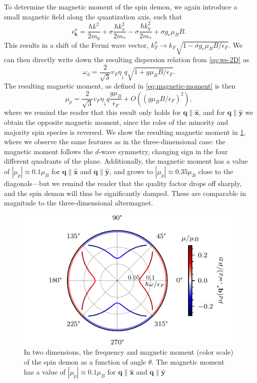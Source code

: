 \documentclass[aps,prb,reprint,twocolumns,superscriptaddress,nofootinbib]{revtex4-2}
\newcommand{\xx}{\hat{\bm{x}}}
\newcommand{\yy}{\hat{\bm{y}}}
\newcommand{\kF}{k_{F}}
\begin{document}
	To determine the magnetic moment of the spin demon, we again introduce a small magnetic field along the quantization axis, such that
	\begin{equation}
		\epsilon_{\bm k}^\sigma = \frac{\hbar k^2}{2m_0} + \sigma \frac{\hbar k_x^2}{2m_*} - \sigma \frac{\hbar k_y^2}{2m_*} + \sigma g_e\mu_B B.
	\end{equation} 
	This results in a shift of the Fermi wave vector, $\kF^\sigma\rightarrow \kF\sqrt{1-\sigma g_e\mu_B B / \epsilon_F}$. We can then directly write down the resulting dispersion relation from \cref{eq:ws-2D} as
	\begin{equation}
		\omega_{d}=\frac{2}{\sqrt{3}} v_F \eta_\downarrow q \sqrt{1+g\mu_B B / \epsilon_F}.
	\end{equation}
	The resulting magnetic moment, as defined in \cref{eq:magnetic-moment} is then
	\begin{equation}
		\mu_p = \frac{2}{\sqrt{3}} v_F \eta_\downarrow q \frac{g\mu_B}{\epsilon_F} + O((g\mu_B B / \epsilon_F)^2),
	\end{equation}
	where we remind the reader that this result only holds for $\bm q\parallel \xx$, and for $\bm q\parallel \yy$ we obtain the opposite magnetic moment, since the roles of the minority and majority spin species is reversed. We show the resulting magnetic moment in \cref{fig:2D-magnetic-moment}, where we observe the same features as in the three-dimensional case: the magnetic moment follows the $d$-wave symmetry, changing sign in the four different quadrants of the plane. Additionally, the magnetic moment has a value of $|\mu_p|\approx 0.1\mu_B$ for $\bm q\parallel\xx$ and $\bm q\parallel\yy$, and grows to $|\mu_p|\approx 0.35\mu_B$ close to the diagonals---but we remind the reader that the quality factor drops off sharply, and the spin demon will thus be significantly damped. These are comparable in magnitude to the three-dimensional altermagnet.
	
	\begin{figure}
		\includegraphics{2D-polar-plot-sign}
		\caption{In two dimensions, the frequency and magnetic moment (color scale) of the spin demon as a function of angle $\theta$. The magnetic moment has a value of $|\mu_p|\approx 0.1\mu_B$ for $\bm q\parallel\xx$ and $\bm q\parallel\yy$ \label{fig:2D-magnetic-moment}}
	\end{figure}
	
\end{document}
